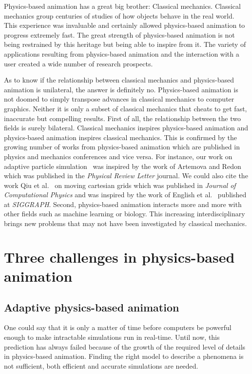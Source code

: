 Physics-based animation has a great big brother: Classical mechanics. Classical mechanics group centuries of studies of how objects behave in the real world. This experience was invaluable and certainly allowed physics-based animation to progress extremely fast. The great strength of physics-based animation is not being restrained by this heritage but being able to inspire from it. The variety of applications resulting from physics-based animation and the interaction with a user created a wide number of research prospects. 

As to know if the relationship between classical mechanics and physics-based animation is unilateral, the answer is definitely no. Physics-based animation is not doomed to simply transpose advances in classical mechanics to computer graphics. Neither it is only a subset of classical mechanics that cheats to get fast, inaccurate but compelling results. 
First of all, the relationship between the two fields is surely bilateral. Classical mechanics inspires physics-based animation and physics-based animation inspires classical mechanics. 
This is confirmed by the growing number of works from physics-based animation which are published in physics and mechanics conferences and vice versa.
For instance, our work on adaptive particle simulation~\cite{Manteaux2013} was inspired by the work of Artemova and Redon~\cite{Artemova2012} which was published in the \emph{Physical Review Letter} journal.
We could also cite the work Qiu et al.~\cite{Qiu2016} on moving cartesian grids which was published in \emph{Journal of Computational Physics} and was inspired by the work of English et al.~\cite{English2013} published at \emph{SIGGRAPH}.
Second, physics-based animation interacts more and more with other fields such as machine learning or biology. This increasing interdisciplinary brings new problems that may not have been investigated by classical mechanics. 

\section{Three challenges in physics-based animation}

\subsection{Adaptive physics-based animation}
One could say that it is only a matter of time before computers be powerful enough to make intractable simulations run in real-time. Until now, this prediction has always failed because of the growth of the required level of details in physics-based animation. Finding the right model to describe a phenomena is not sufficient, both efficient and accurate simulations are needed.

